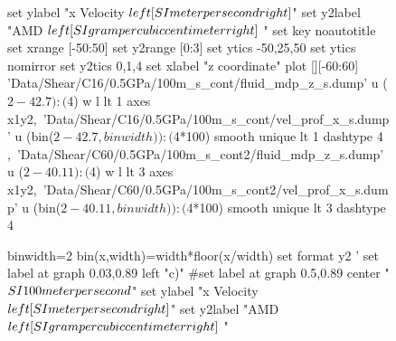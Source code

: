 \documentclass[aps,prb,reprint,superscriptaddress, a4paper]{revtex4-1}
\begin{document}
\begin{figure}[h]
\begin{center}
\begin{gnuplot}[terminal=pdf, terminaloptions={size \SERFigwidth cm, \SERFigheight cm color solid}]
			set ylabel "x Velocity $\\left[ \\SI{}{\\meter\\per\\second} \\right]$"
			set y2label "AMD $\\left[ \\SI{}{\\gram\\per\\cubic\\centi\\meter} \\right]$ "
			set key noautotitle
			set xrange [-50:50]
			set y2range [0:3]
			set ytics  -50,25,50
			set ytics nomirror
			set y2tics 0,1,4
			set xlabel "z coordinate"  
			plot  	[][-60:60]  'Data/Shear/C16/0.5GPa/100m_s_cont/fluid_mdp_z_s.dump' u ($2-42.7):($4) w l  lt 1 axes x1y2,\
				              'Data/Shear/C16/0.5GPa/100m_s_cont/vel_prof_x_s.dump'  u (bin($2-42.7,binwidth)):($4*100) smooth unique lt 1 dashtype 4 ,\
                              'Data/Shear/C60/0.5GPa/100m_s_cont2/fluid_mdp_z_s.dump' u ($2-40.11):($4) w l  lt 3  axes x1y2,\
				              'Data/Shear/C60/0.5GPa/100m_s_cont2/vel_prof_x_s.dump'  u (bin($2-40.11,binwidth)):($4*100) smooth unique lt 3 dashtype 4 
		\end{gnuplot}
		\begin{gnuplot}[terminal=pdf, terminaloptions={size \SERFigwidth cm, \SERFigheight cm color solid}]
			binwidth=2
			bin(x,width)=width*floor(x/width)
			set format y2 '%
			set label at graph 0.03,0.89 left "c)"
			#set label at graph 0.5,0.89 center "$\\SI{100}{\\meter\\per\\second}$"
			set ylabel "x Velocity $\\left[ \\SI{}{\\meter\\per\\second} \\right]$"
			set y2label "AMD $\\left[ \\SI{}{\\gram\\per\\cubic\\centi\\meter} \\right]$ "

\end{gnuplot}
\end{center}
\end{figure}
\end{document}

